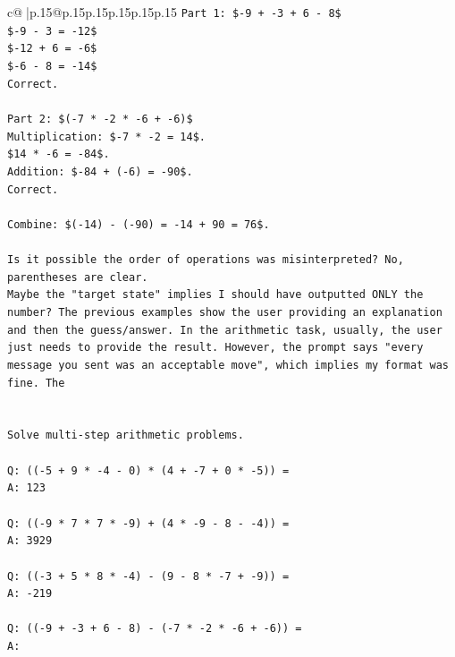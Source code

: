 \documentclass{article}
\begin{document}
{\begin{supertabular}{c@{$\;$}|p{.15\linewidth}@{}p{.15\linewidth}p{.15\linewidth}p{.15\linewidth}p{.15\linewidth}p{.15\linewidth}}
{{{\texttt{Part 1: \${-}9 + {-}3 + 6 {-} 8\$} \\
\texttt{\${-}9 {-} 3 = {-}12\$} \\
\texttt{\${-}12 + 6 = {-}6\$} \\
\texttt{\${-}6 {-} 8 = {-}14\$} \\
\texttt{Correct.} \\
\\ 
\texttt{Part 2: \$({-}7 * {-}2 * {-}6 + {-}6)\$} \\
\texttt{Multiplication: \${-}7 * {-}2 = 14\$.} \\
\texttt{\$14 * {-}6 = {-}84\$.} \\
\texttt{Addition: \${-}84 + ({-}6) = {-}90\$.} \\
\texttt{Correct.} \\
\\ 
\texttt{Combine: \$({-}14) {-} ({-}90) = {-}14 + 90 = 76\$.} \\
\\ 
\texttt{Is it possible the order of operations was misinterpreted? No, parentheses are clear.} \\
\texttt{Maybe the "target state" implies I should have outputted ONLY the number? The previous examples show the user providing an explanation and then the guess/answer. In the arithmetic task, usually, the user just needs to provide the result. However, the prompt says "every message you sent was an acceptable move", which implies my format was fine. The} \\
\\ 
\\ 
\texttt{Solve multi{-}step arithmetic problems.} \\
\\ 
\texttt{Q: (({-}5 + 9 * {-}4 {-} 0) * (4 + {-}7 + 0 * {-}5)) =} \\
\texttt{A: 123} \\
\\ 
\texttt{Q: (({-}9 * 7 * 7 * {-}9) + (4 * {-}9 {-} 8 {-} {-}4)) =} \\
\texttt{A: 3929} \\
\\ 
\texttt{Q: (({-}3 + 5 * 8 * {-}4) {-} (9 {-} 8 * {-}7 + {-}9)) =} \\
\texttt{A: {-}219} \\
\\ 
\texttt{Q: (({-}9 + {-}3 + 6 {-} 8) {-} ({-}7 * {-}2 * {-}6 + {-}6)) =} \\
\texttt{A:} \\
            }
        }
    }
     \\ \\


\end{supertabular}}
\end{document}
